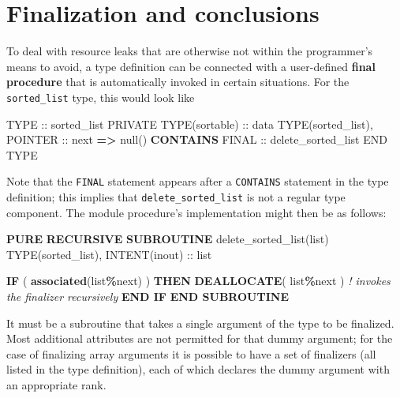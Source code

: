 \documentclass[
  paper=a4,
  ,captions=tableheading
]{scrartcl}
\newenvironment{Shaded}{\begin{snugshade}}{\end{snugshade}}
\newcommand{\CommentTok}[1]{\textcolor[rgb]{0.56,0.35,0.01}{\textit{#1}}}
\newcommand{\DataTypeTok}[1]{\textcolor[rgb]{0.13,0.29,0.53}{#1}}
\newcommand{\FunctionTok}[1]{\textcolor[rgb]{0.13,0.29,0.53}{\textbf{#1}}}
\newcommand{\KeywordTok}[1]{\textcolor[rgb]{0.13,0.29,0.53}{\textbf{#1}}}
\newcommand{\NormalTok}[1]{#1}
\newcommand{\OperatorTok}[1]{\textcolor[rgb]{0.81,0.36,0.00}{\textbf{#1}}}
\begin{document}
\section{Finalization and
conclusions}\label{finalization-and-conclusions}

To deal with resource leaks that are otherwise not within the
programmer's means to avoid, a type definition can be connected with a
user-defined \textbf{final procedure} that is automatically invoked in
certain situations. For the \texttt{sorted\_list} type, this would look
like

\begin{Shaded}
\begin{Highlighting}[]
\DataTypeTok{TYPE} \DataTypeTok{::}\NormalTok{ sorted\_list}
   \DataTypeTok{PRIVATE}
   \DataTypeTok{TYPE(sortable)} \DataTypeTok{::}\NormalTok{ data}
   \DataTypeTok{TYPE(sorted\_list)}\NormalTok{, }\DataTypeTok{POINTER} \DataTypeTok{::}\NormalTok{ next }\KeywordTok{=}\OperatorTok{\textgreater{}}\NormalTok{ null()}
\KeywordTok{CONTAINS}
   \DataTypeTok{FINAL} \DataTypeTok{::}\NormalTok{ delete\_sorted\_list}
\DataTypeTok{END TYPE}
\end{Highlighting}
\end{Shaded}

Note that the \texttt{FINAL} statement appears after a \texttt{CONTAINS}
statement in the type definition; this implies that
\texttt{delete\_sorted\_list} is not a regular type component. The
module procedure's implementation might then be as follows:

\begin{Shaded}
\begin{Highlighting}[]
\KeywordTok{PURE} \KeywordTok{RECURSIVE} \KeywordTok{SUBROUTINE}\NormalTok{ delete\_sorted\_list(list)}
   \DataTypeTok{TYPE(sorted\_list)}\NormalTok{, }\DataTypeTok{INTENT(inout)} \DataTypeTok{::}\NormalTok{ list}

   \KeywordTok{IF}\NormalTok{ ( }\FunctionTok{associated}\NormalTok{(list}\OperatorTok{\%}\NormalTok{next) ) }\KeywordTok{THEN}
      \KeywordTok{DEALLOCATE}\NormalTok{( list}\OperatorTok{\%}\NormalTok{next )  }\CommentTok{! invokes the finalizer recursively}
   \KeywordTok{END IF}
\KeywordTok{END SUBROUTINE}
\end{Highlighting}
\end{Shaded}

It must be a subroutine that takes a single argument of the type to be
finalized. Most additional attributes are not permitted for that dummy
argument; for the case of finalizing array arguments it is possible to
have a set of finalizers (all listed in the type definition), each of
which declares the dummy argument with an appropriate rank.
\end{document}
